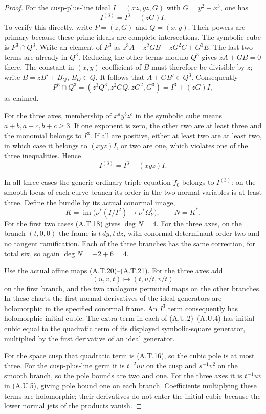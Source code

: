 \begin{proof}
For the cusp-plus-line ideal $I=(xz,yz,G)$ with
$G=y^2-x^3$, one has
\[
                   I^{(3)}=I^3+(zG)I.             \tag{A.U.3}
\]
To verify this directly, write $P=(z,G)$ and
$Q=(x,y)$. Their powers are primary because these
prime ideals are complete intersections. The
symbolic cube is $P^3\cap Q^3$.
Write an element of $P^3$ as
$z^3A+z^2GB+zG^2C+G^3E$.
The last two terms are already in $Q^3$.
Reducing the other terms modulo $Q^3$ gives
$zA+GB=0$ there. The constant-in-$(x,y)$ coefficient
of $B$ must therefore be divisible by $z$; write
$B=zB'+B_Q$, $B_Q\in Q$.
It follows that $A+GB'\in Q^3$.
Consequently
\[
 P^3\cap Q^3=(z^3Q^3,z^2GQ,zG^2,G^3)
                        =I^3+(zG)I,
\]
as claimed.

For the three axes, membership of
$x^a y^b z^c$ in the symbolic cube means
$a+b,a+c,b+c\ge3$.
If one exponent is zero, the other two are at
least three and the monomial belongs to $I^3$.
If all are positive, either at least two are at
least two, in which case it belongs to $(xyz)I$,
or two are one, which violates one of the three
inequalities. Hence
\[
                         I^{(3)}=I^3+(xyz)I.       \tag{A.U.4}
\]

In all three cases the generic ordinary-triple
equation $f_0$ belongs to $I^{(3)}$: on the smooth
locus of each curve branch its order in the two
normal variables is at least three. Define the
bundle by its actual conormal image,
\[
 K=\operatorname{im}\bigl(\nu^*(I/I^2)
                           \to\nu^*\Omega_Y^1\bigr),
 \qquad N=K^*.
\]
For the first two cases (A.T.18) gives $\deg N=4$.
For the three axes, on the branch $(t,0,0)$ the
frame is $t\,dy,t\,dz$, with conormal determinant
order two and no tangent ramification. Each of the
three branches has the same correction, for total
six, so again $\deg N=-2+6=4$.

Use the actual affine maps (A.T.20)--(A.T.21).
For the three axes add
\[
              (u,v,t)\longmapsto(t,u/t,v/t)
                                                        \tag{A.U.5}
\]
on the first branch, and the two analogous permuted
maps on the other branches. In these charts the
first normal derivatives of the ideal generators
are holomorphic in the specified conormal frame.
An $I^3$ term consequently has holomorphic initial
cubic. The extra term in each of (A.U.2)--(A.U.4)
has initial cubic equal to the quadratic term of
its displayed symbolic-square generator, multiplied
by the first derivative of an ideal generator.

For the space cusp that quadratic term is (A.T.16),
so the cubic pole is at most three. For the
cusp-plus-line germ it is $t^{-2}uv$ on the cusp
and $s^{-1}v^2$ on the smooth branch, so the pole
bounds are two and one. For the three axes it is
$t^{-1}uv$ in (A.U.5), giving pole bound one on
each branch. Coefficients multiplying these terms
are holomorphic; their derivatives do not enter
the initial cubic because the lower normal jets
of the products vanish.


\end{proof}

